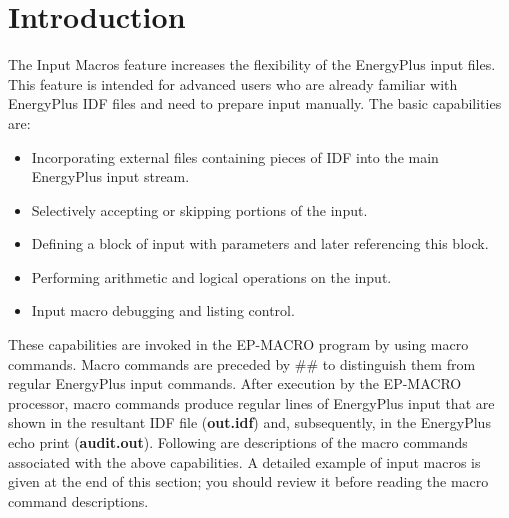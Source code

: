\section{Introduction}\label{introduction}

The Input Macros feature increases the flexibility of the EnergyPlus input files. This feature is intended for advanced users who are already familiar with EnergyPlus IDF files and need to prepare input manually. The basic capabilities are:

\begin{itemize}
\item
  Incorporating external files containing pieces of IDF into the main EnergyPlus input stream.
\item
  Selectively accepting or skipping portions of the input.
\item
  Defining a block of input with parameters and later referencing this block.
\item
  Performing arithmetic and logical operations on the input.
\item
  Input macro debugging and listing control.
\end{itemize}

These capabilities are invoked in the EP-MACRO program by using macro commands. Macro commands are preceded by \#\# to distinguish them from regular EnergyPlus input commands. After execution by the EP-MACRO processor, macro commands produce regular lines of EnergyPlus input that are shown in the resultant IDF file (\textbf{out.idf}) and, subsequently, in the EnergyPlus echo print (\textbf{audit.out}). Following are descriptions of the macro commands associated with the above capabilities. A detailed example of input macros is given at the end of this section; you should review it before reading the macro command descriptions.
